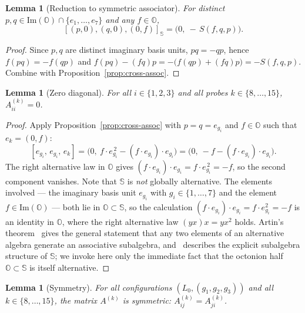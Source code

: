 \documentclass[12pt,a4paper]{article}
\newtheorem{lemma}[theorem]{Lemma}
\begin{document}
\begin{lemma}[Reduction to symmetric associator]
\label{lem:reduction-to-S}
For distinct $p, q \in \mathrm{Im}(\mathbb{O}) \cap \{e_1,\ldots,e_7\}$ and any $f \in \mathbb{O}$,
\[
  [(p,0),(q,0),(0,f)]_{\mathbb{S}} = \bigl(0,\ -\,S(f, q, p)\bigr).
\]
\end{lemma}

\begin{proof}
Since $p, q$ are distinct imaginary basis units, $pq = -qp$, hence $f(pq) = -f(qp)$ and
$f(pq) - (fq)p = -\bigl(f(qp) + (fq)p\bigr) = -S(f,q,p)$.
Combine with Proposition~\ref{prop:cross-assoc}.
\end{proof}

\begin{lemma}[Zero diagonal]\label{lem:diag0}\label{lem:zero-diagonal}
For all $i\in\{1,2,3\}$ and all probes $k\in\{8,\dots,15\}$, $A^{(k)}_{ii}=0$.
\end{lemma}

\begin{proof}
Apply Proposition~\ref{prop:cross-assoc} with $p = q = e_{g_i}$ and $f \in \mathbb{O}$
such that $e_k = (0, f)$:
\[
  [e_{g_i},\, e_{g_i},\, e_k] = \bigl(0,\ f \cdot e_{g_i}^{\,2} - (f \cdot e_{g_i}) \cdot e_{g_i}\bigr)
  = \bigl(0,\ -f - (f \cdot e_{g_i}) \cdot e_{g_i}\bigr).
\]
The right alternative law in $\mathbb{O}$ gives $(f \cdot e_{g_i}) \cdot e_{g_i} = f \cdot e_{g_i}^{\,2} = -f$,
so the second component vanishes.
Note that $\mathbb{S}$ is \emph{not} globally alternative. The elements involved --- the imaginary basis unit $e_{g_i}$ with $g_i \in \{1, \ldots, 7\}$ and the element $f \in \mathrm{Im}(\mathbb{O})$ --- both lie in $\mathbb{O} \subset \mathbb{S}$, so the calculation $(f \cdot e_{g_i}) \cdot e_{g_i} = f \cdot e_{g_i}^2 = -f$ is an identity in $\mathbb{O}$, where the right alternative law $(yx)x = yx^2$ holds. Artin's theorem~\cite[\S III.2]{Schafer1966} gives the general statement that any two elements of an alternative algebra generate an associative subalgebra, and~\cite[\S3--4]{Cawagas2004} describes the explicit subalgebra structure of $\mathbb{S}$; we invoke here only the immediate fact that the octonion half $\mathbb{O} \subset \mathbb{S}$ is itself alternative.
\end{proof}

\begin{lemma}[Symmetry]
\label{lem:symmetry}
For all configurations $(L_0, (g_1, g_2, g_3))$ and all $k \in \{8, \ldots, 15\}$, the matrix $A^{(k)}$ is symmetric: $A^{(k)}_{ij} = A^{(k)}_{ji}$.
\end{lemma}
\end{document}
